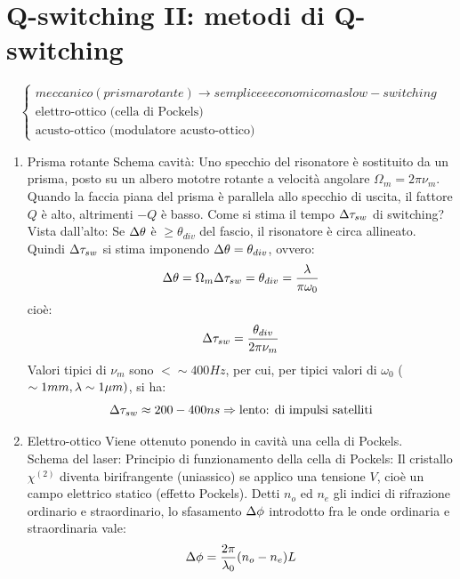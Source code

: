 \chapter{Q-switching II: metodi di Q-switching}
\[
\begin{cases}
meccanico (prisma rotante) \rightarrow semplice e economico ma slow-switching\\
\text{elettro-ottico (cella di Pockels)}\\
\text{acusto-ottico (modulatore acusto-ottico)}
\end{cases}
\]
\begin{enumerate}
\item Prisma rotante
Schema cavità:
Uno specchio del risonatore è sostituito da un prisma, posto su un albero mototre rotante a velocità angolare $\Omega_m = 2\pi \nu_m$. Quando la faccia piana del prisma è parallela allo specchio di uscita, il fattore $Q$ è alto, altrimenti $-Q$ è basso. Come si stima il tempo $\Delta\tau_{sw}$ di switching?\\
Vista dall'alto:
Se $\Delta\theta$ è $\geq \theta_{div}$ del fascio, il risonatore è circa allineato. Quindi $\Delta\tau_{sw}$ si stima imponendo $\Delta\theta = \theta_{div}$, ovvero:
\begin{equation*}
\Delta\theta = \Omega_m \Delta\tau_{sw} = \theta_{div} = \frac{\lambda}{\pi\omega_0}
\end{equation*}
cioè:
\begin{equation*}
\Delta\tau_{sw} = \frac{\theta_{div}}{2\pi\nu_m}
\end{equation*}
Valori tipici di $\nu_m$ sono $< \sim 400 Hz$, per cui, per tipici valori di $\omega_0$ ($\sim 1 mm, \lambda \sim 1 \mu m)$, si ha:
\begin{equation*}
\Delta\tau_{sw} \approx 200 -400 ns \Rightarrow \text{lento: di impulsi satelliti}
\end{equation*}
\item Elettro-ottico
Viene ottenuto ponendo in cavità una cella di Pockels.\\
Schema del laser:
Principio di funzionamento della cella di Pockels:
Il cristallo $\chi^{(2)}$ diventa birifrangente (uniassico) se applico una tensione $V$, cioè un campo elettrico statico (effetto Pockels). Detti $n_o$ ed $n_e$ gli indici di rifrazione ordinario e straordinario, lo sfasamento $\Delta\phi$ introdotto fra le onde ordinaria e straordinaria vale:
\begin{equation*}
\Delta\phi = \frac{2\pi}{\lambda_0} (n_o - n_e) L
\end{equation*}

\end{enumerate}
